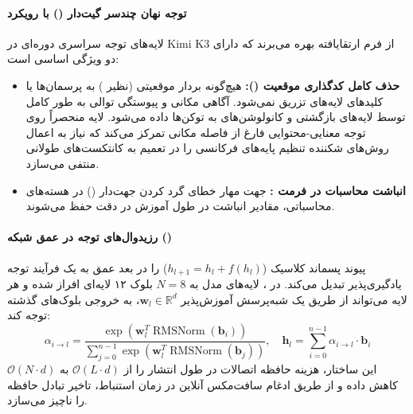 \paragraph*{توجه نهان چندسر گیت‌دار () با رویکرد }
لایه‌های توجه سراسری دوره‌ای در Kimi K3 از فرم ارتقایافته  بهره می‌برند که دارای دو ویژگی اساسی است:
\begin{itemize}
    \item \textbf{حذف کامل کدگذاری موقعیت ():} هیچ‌گونه بردار موقعیتی (نظیر ) به پرسمان‌ها یا کلیدهای لایه‌های  تزریق نمی‌شود. آگاهی مکانی و پیوستگی توالی به طور کامل توسط لایه‌های بازگشتی و کانولوشن‌های  به توکن‌ها داده می‌شود. لایه  منحصراً روی توجه معنایی-محتوایی فارغ از فاصله مکانی تمرکز می‌کند که نیاز به اعمال روش‌های شکننده تنظیم پایه‌های فرکانسی را در تعمیم به کانتکست‌های طولانی منتفی می‌سازد.
    \item \textbf{انباشت محاسبات در فرمت :} جهت مهار خطای گرد کردن جهت‌دار () در هسته‌های محاسباتی، مقادیر انباشت در طول آموزش در دقت  حفظ می‌شوند.
\end{itemize}

\paragraph*{رزیدوال‌های توجه در عمق شبکه ()}
 پیوند پسماند کلاسیک ($h_{l+1} = h_l + f(h_l)$) را در بعد عمق به یک فرآیند توجه یادگیری‌پذیر تبدیل می‌کند. در ، لایه‌های مدل به $N=8$ بلوک ۱۲ لایه‌ای افراز شده و هر لایه می‌تواند از طریق یک شبه‌پرسش آموزش‌پذیر $\mathbf{w}_l \in \mathbb{R}^d$، به خروجی بلوک‌های گذشته توجه کند:
\begin{equation}
    \alpha_{i \to l} = \frac{\exp\left( \mathbf{w}_l^T \operatorname{RMSNorm}(\mathbf{b}_i) \right)}{\sum_{j=0}^{n-1} \exp\left( \mathbf{w}_l^T \operatorname{RMSNorm}(\mathbf{b}_j) \right)}, \quad \mathbf{h}_l = \sum_{i=0}^{n-1} \alpha_{i \to l} \cdot \mathbf{b}_i
\end{equation}
این ساختار، هزینه حافظه اتصالات در طول انتشار را از $\mathcal{O}(L \cdot d)$ به $\mathcal{O}(N \cdot d)$ کاهش داده و از طریق ادغام سافت‌مکس آنلاین در زمان استنباط، تاخیر تبادل حافظه را ناچیز می‌سازد.

